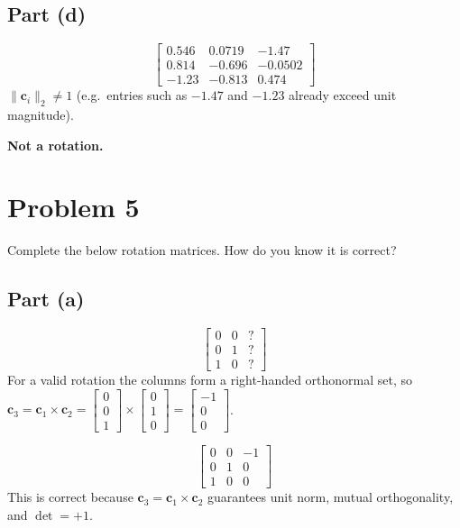 \documentclass[11pt]{article}
\begin{document}
\subsection*{Part (d)}
\[
    \begin{bmatrix}
        0.546 & 0.0719 & -1.47 \\
        0.814 & -0.696 & -0.0502 \\
        -1.23 & -0.813 & 0.474
    \end{bmatrix}
\]
$\lVert\bm c_i\rVert_2\neq1$ (e.g.\ entries such as $-1.47$ and $-1.23$ already exceed unit magnitude).
\begin{result}
\textbf{Not a rotation.}
\end{result}

\newpage
\section*{Problem 5}

\begin{statement}
Complete the below rotation matrices. How do you know it is correct?
\end{statement}

\subsection*{Part (a)}
\[
    \begin{bmatrix}
        0 & 0 & ? \\
        0 & 1 & ? \\
        1 & 0 & ?
    \end{bmatrix}
\]
For a valid rotation the columns form a right-handed orthonormal set, so $\bm c_3 = \bm c_1\times\bm c_2 = \begin{bmatrix}0\\0\\1\end{bmatrix}\times\begin{bmatrix}0\\1\\0\end{bmatrix} = \begin{bmatrix}-1\\0\\0\end{bmatrix}$.
\begin{result}
\[
    \begin{bmatrix}
        0 & 0 & -1 \\
        0 & 1 & 0 \\
        1 & 0 & 0
    \end{bmatrix}
\]
This is correct because $\bm c_3=\bm c_1\times\bm c_2$ guarantees unit norm, mutual orthogonality, and $\det=+1$.
\end{result}
\end{document}
